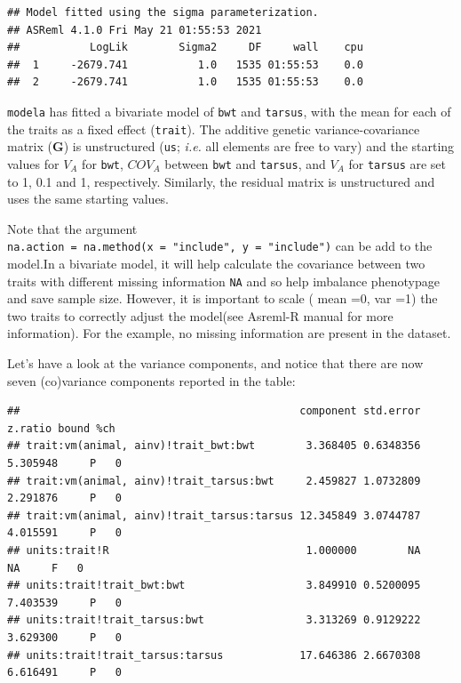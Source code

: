 \documentclass[
  12pt,
]{book}
\newenvironment{Shaded}{\begin{snugshade}}{\end{snugshade}}
\newcommand{\FunctionTok}[1]{\textcolor[rgb]{0.00,0.00,0.00}{#1}}
\newcommand{\NormalTok}[1]{#1}
\newcommand{\SpecialCharTok}[1]{\textcolor[rgb]{0.00,0.00,0.00}{#1}}
\begin{document}
\begin{verbatim}
## Model fitted using the sigma parameterization.
## ASReml 4.1.0 Fri May 21 01:55:53 2021
##           LogLik        Sigma2     DF     wall    cpu
##  1     -2679.741           1.0   1535 01:55:53    0.0
##  2     -2679.741           1.0   1535 01:55:53    0.0
\end{verbatim}

\texttt{modela} has fitted a bivariate model of \texttt{bwt} and \texttt{tarsus}, with the mean for each of the traits as a fixed effect (\texttt{trait}). The additive genetic variance-covariance matrix (\(\textbf{G}\)) is unstructured (\texttt{us}; \emph{i.e.} all elements are free to vary) and the starting values for \(V_A\) for \texttt{bwt}, \(COV_A\) between \texttt{bwt} and \texttt{tarsus}, and \(V_A\) for \texttt{tarsus} are set to 1, 0.1 and 1, respectively. Similarly, the residual matrix is unstructured and uses the same starting values.

Note that the argument \texttt{na.action\ =\ na.method(x\ =\ "include",\ y\ =\ "include")} can be add to the model.In a bivariate model, it will help calculate the covariance between two traits with different missing information \texttt{NA} and so help imbalance phenotypage and save sample size. However, it is important to scale ( mean =0, var =1) the two traits to correctly adjust the model(see Asreml-R manual for more information).
For the example, no missing information are present in the dataset.

Let's have a look at the variance components, and notice that there are now seven (co)variance components reported in the table:

\begin{Shaded}
\end{Shaded}

\begin{verbatim}
##                                            component std.error  z.ratio bound %ch
## trait:vm(animal, ainv)!trait_bwt:bwt        3.368405 0.6348356 5.305948     P   0
## trait:vm(animal, ainv)!trait_tarsus:bwt     2.459827 1.0732809 2.291876     P   0
## trait:vm(animal, ainv)!trait_tarsus:tarsus 12.345849 3.0744787 4.015591     P   0
## units:trait!R                               1.000000        NA       NA     F   0
## units:trait!trait_bwt:bwt                   3.849910 0.5200095 7.403539     P   0
## units:trait!trait_tarsus:bwt                3.313269 0.9129222 3.629300     P   0
## units:trait!trait_tarsus:tarsus            17.646386 2.6670308 6.616491     P   0
\end{verbatim}
\end{document}
